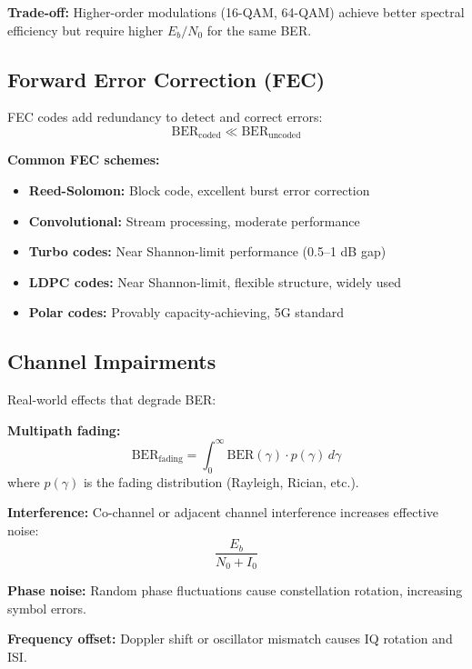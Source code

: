 \textbf{Trade-off:} Higher-order modulations (16-QAM, 64-QAM) achieve better spectral efficiency but require higher $E_b/N_0$ for the same BER.

\subsection{Forward Error Correction (FEC)}

FEC codes add redundancy to detect and correct errors:
\begin{equation}
\mathrm{BER}_{\mathrm{coded}} \ll \mathrm{BER}_{\mathrm{uncoded}}
\label{eq:ber-fec}
\end{equation}

\textbf{Common FEC schemes:}
\begin{itemize}
\item \textbf{Reed-Solomon:} Block code, excellent burst error correction
\item \textbf{Convolutional:} Stream processing, moderate performance
\item \textbf{Turbo codes:} Near Shannon-limit performance (0.5--1 dB gap)
\item \textbf{LDPC codes:} Near Shannon-limit, flexible structure, widely used
\item \textbf{Polar codes:} Provably capacity-achieving, 5G standard
\end{itemize}

\subsection{Channel Impairments}

Real-world effects that degrade BER:

\textbf{Multipath fading:}
\begin{equation}
\mathrm{BER}_{\mathrm{fading}} = \int_0^\infty \mathrm{BER}(\gamma) \cdot p(\gamma)\,d\gamma
\label{eq:ber-fading}
\end{equation}
where $p(\gamma)$ is the fading distribution (Rayleigh, Rician, etc.).

\textbf{Interference:} Co-channel or adjacent channel interference increases effective noise:
\begin{equation}
\frac{E_b}{N_0 + I_0}
\label{eq:eb-n0-interference}
\end{equation}

\textbf{Phase noise:} Random phase fluctuations cause constellation rotation, increasing symbol errors.

\textbf{Frequency offset:} Doppler shift or oscillator mismatch causes IQ rotation and ISI.

